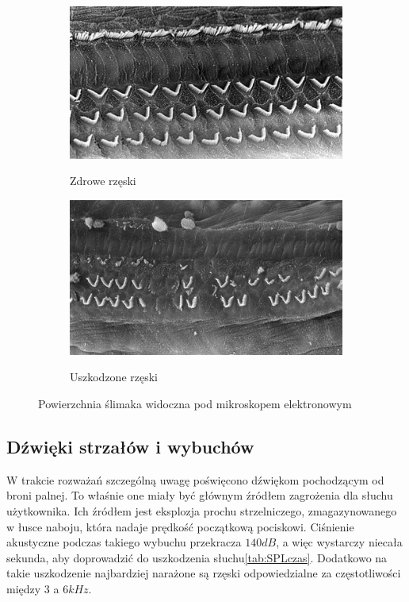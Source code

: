 \begin{figure}[H]
	\centering
	\begin{subfigure}{.45\textwidth}
		\centering
		\includegraphics[scale=0.45]{zdjecia/cochlee-normale.jpg}
		\label{normal_cochlea}
		\caption{Zdrowe rzęski}
	\end{subfigure}
	\begin{subfigure}{.45\textwidth}
		\centering
		\includegraphics[scale=0.44]{zdjecia/traumatisme-sonore-niveau-2.jpg}
		\label{damaged_cochlea}
		\caption{Uszkodzone rzęski}
	\end{subfigure}
	\caption{Powierzchnia ślimaka widoczna pod mikroskopem elektronowym\cite{RzeskiMikorskop}}
\end{figure}


\subsection{Dźwięki strzałów i wybuchów}

W trakcie rozważań szczególną uwagę poświęcono dźwiękom pochodzącym od broni palnej. To właśnie one miały być głównym źródłem zagrożenia dla słuchu użytkownika. 
Ich źródłem jest eksplozja prochu strzelniczego, zmagazynowanego w łusce naboju, która nadaje prędkość początkową pociskowi. Ciśnienie akustyczne podczas takiego wybuchu przekracza $ 140 dB $, a więc wystarczy niecała sekunda, aby doprowadzić do uszkodzenia słuchu\ref{tab:SPLczas}. Dodatkowo na takie uszkodzenie najbardziej narażone są rzęski odpowiedzialne za częstotliwości między $ 3 $ a $ 6kHz $\cite{BadaniePolicjantow}. 

